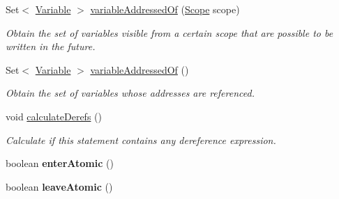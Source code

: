 \begin{DoxyCompactItemize}
\item 
Set$<$ \hyperlink{interfaceedu_1_1udel_1_1cis_1_1vsl_1_1civl_1_1model_1_1IF_1_1variable_1_1Variable}{Variable} $>$ \hyperlink{classedu_1_1udel_1_1cis_1_1vsl_1_1civl_1_1model_1_1common_1_1statement_1_1CommonAtomicLockAssignStatement_a70bf6dc254ba55623479926bd79da4cf}{variable\+Addressed\+Of} (\hyperlink{interfaceedu_1_1udel_1_1cis_1_1vsl_1_1civl_1_1model_1_1IF_1_1Scope}{Scope} scope)
\begin{DoxyCompactList}\small\item\em Obtain the set of variables visible from a certain scope that are possible to be written in the future. \end{DoxyCompactList}\item 
Set$<$ \hyperlink{interfaceedu_1_1udel_1_1cis_1_1vsl_1_1civl_1_1model_1_1IF_1_1variable_1_1Variable}{Variable} $>$ \hyperlink{classedu_1_1udel_1_1cis_1_1vsl_1_1civl_1_1model_1_1common_1_1statement_1_1CommonAtomicLockAssignStatement_a69e7444a3611345e8562569bfdda8c78}{variable\+Addressed\+Of} ()
\begin{DoxyCompactList}\small\item\em Obtain the set of variables whose addresses are referenced. \end{DoxyCompactList}\item 
\hypertarget{classedu_1_1udel_1_1cis_1_1vsl_1_1civl_1_1model_1_1common_1_1statement_1_1CommonAtomicLockAssignStatement_a92bd68fdc6ace1da4c8491ffbe33612d}{}void \hyperlink{classedu_1_1udel_1_1cis_1_1vsl_1_1civl_1_1model_1_1common_1_1statement_1_1CommonAtomicLockAssignStatement_a92bd68fdc6ace1da4c8491ffbe33612d}{calculate\+Derefs} ()\label{classedu_1_1udel_1_1cis_1_1vsl_1_1civl_1_1model_1_1common_1_1statement_1_1CommonAtomicLockAssignStatement_a92bd68fdc6ace1da4c8491ffbe33612d}

\begin{DoxyCompactList}\small\item\em Calculate if this statement contains any dereference expression. \end{DoxyCompactList}\item 
\hypertarget{classedu_1_1udel_1_1cis_1_1vsl_1_1civl_1_1model_1_1common_1_1statement_1_1CommonAtomicLockAssignStatement_a542ab6ed6c5d192de8d1500d79b5bd6f}{}boolean {\bfseries enter\+Atomic} ()\label{classedu_1_1udel_1_1cis_1_1vsl_1_1civl_1_1model_1_1common_1_1statement_1_1CommonAtomicLockAssignStatement_a542ab6ed6c5d192de8d1500d79b5bd6f}

\item 
\hypertarget{classedu_1_1udel_1_1cis_1_1vsl_1_1civl_1_1model_1_1common_1_1statement_1_1CommonAtomicLockAssignStatement_a7a282e56234a684d743544b296e4b540}{}boolean {\bfseries leave\+Atomic} ()\label{classedu_1_1udel_1_1cis_1_1vsl_1_1civl_1_1model_1_1common_1_1statement_1_1CommonAtomicLockAssignStatement_a7a282e56234a684d743544b296e4b540}

\end{DoxyCompactItemize}
